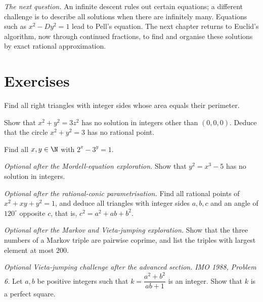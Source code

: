 \medskip
\noindent\emph{The next question.} An infinite descent rules out certain equations; a different challenge is to describe all solutions when there are infinitely many. Equations such as $x^2-Dy^2=1$ lead to Pell's equation. The next chapter returns to Euclid's algorithm, now through continued fractions, to find and organise these solutions by exact rational approximation.

\section{Exercises}

\begin{exercise}[$\star$]\label{ex:areaper}
Find all right triangles with integer sides whose area equals their perimeter.
\end{exercise}

\begin{exercise}[$\star$]\label{ex:x2y23z2}
Show that $x^2+y^2=3z^2$ has no solution in integers other than $(0,0,0)$. Deduce that the circle $x^2+y^2=3$ has no rational point.
\end{exercise}

\begin{exercise}[$\star$]\label{ex:catalan23}
Find all $x,y\in\N$ with $2^x-3^y=1$.
\end{exercise}

\begin{exercise}[$\star\star$]\label{ex:mordell5}
\emph{Optional after the Mordell-equation exploration.}
Show that $y^2=x^3-5$ has no solution in integers.
\end{exercise}

\begin{exercise}[$\star\star$]\label{ex:eisentri}
\emph{Optional after the rational-conic parametrisation.}
Find all rational points of $x^2+xy+y^2=1$, and deduce all triangles with integer sides $a,b,c$ and an angle of $120^\circ$ opposite $c$, that is, $c^2=a^2+ab+b^2$.
\end{exercise}

\begin{exercise}[$\star\star$]\label{ex:markovcoprime}
\emph{Optional after the Markov and Vieta-jumping exploration.}
Show that the three numbers of a Markov triple are pairwise coprime, and list the triples with largest element at most $200$.
\end{exercise}

\begin{exercise}[$\star\star\star$]\label{ex:imo88}
\emph{Optional Vieta-jumping challenge after the advanced section.}
\emph{IMO 1988, Problem 6.} Let $a,b$ be positive integers such that $k=\dfrac{a^2+b^2}{ab+1}$ is an integer. Show that $k$ is a perfect square.
\end{exercise}

